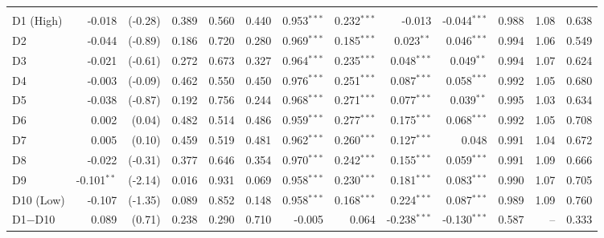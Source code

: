 {\begin{longtable}[t]{lrrrrrrrrrrrr}
\addlinespace[0.3em]
\hline
\multicolumn{13}{l}{\textit{Panel E: P3 (from Sep 2010), cohorts 5, 6, 7}}\\
\hspace{1em}D1 (High) & -0.018 & (-0.28) & 0.389 & 0.560 & 0.440 & 0.953$^{***}$ & 0.232$^{***}$ & -0.013 & -0.044$^{***}$ & 0.988 & 1.08 & 0.638\\
\hspace{1em}D2 & -0.044 & (-0.89) & 0.186 & 0.720 & 0.280 & 0.969$^{***}$ & 0.185$^{***}$ & 0.023$^{**}$ & 0.046$^{***}$ & 0.994 & 1.06 & 0.549\\
\hspace{1em}D3 & -0.021 & (-0.61) & 0.272 & 0.673 & 0.327 & 0.964$^{***}$ & 0.235$^{***}$ & 0.048$^{***}$ & 0.049$^{**}$ & 0.994 & 1.07 & 0.624\\
\hspace{1em}D4 & -0.003 & (-0.09) & 0.462 & 0.550 & 0.450 & 0.976$^{***}$ & 0.251$^{***}$ & 0.087$^{***}$ & 0.058$^{***}$ & 0.992 & 1.05 & 0.680\\
\hspace{1em}D5 & -0.038 & (-0.87) & 0.192 & 0.756 & 0.244 & 0.968$^{***}$ & 0.271$^{***}$ & 0.077$^{***}$ & 0.039$^{**}$ & 0.995 & 1.03 & 0.634\\
\hspace{1em}D6 & 0.002 & (0.04) & 0.482 & 0.514 & 0.486 & 0.959$^{***}$ & 0.277$^{***}$ & 0.175$^{***}$ & 0.068$^{***}$ & 0.992 & 1.05 & 0.708\\
\hspace{1em}D7 & 0.005 & (0.10) & 0.459 & 0.519 & 0.481 & 0.962$^{***}$ & 0.260$^{***}$ & 0.127$^{***}$ & 0.048 & 0.991 & 1.04 & 0.672\\
\hspace{1em}D8 & -0.022 & (-0.31) & 0.377 & 0.646 & 0.354 & 0.970$^{***}$ & 0.242$^{***}$ & 0.155$^{***}$ & 0.059$^{***}$ & 0.991 & 1.09 & 0.666\\
\hspace{1em}D9 & -0.101$^{**}$ & (-2.14) & 0.016 & 0.931 & 0.069 & 0.958$^{***}$ & 0.230$^{***}$ & 0.181$^{***}$ & 0.083$^{***}$ & 0.990 & 1.07 & 0.705\\
\hspace{1em}D10 (Low) & -0.107 & (-1.35) & 0.089 & 0.852 & 0.148 & 0.958$^{***}$ & 0.168$^{***}$ & 0.224$^{***}$ & 0.087$^{***}$ & 0.989 & 1.09 & 0.760\\
\hspace{1em}D1$-$D10 & 0.089 & (0.71) & 0.238 & 0.290 & 0.710 & -0.005 & 0.064 & -0.238$^{***}$ & -0.130$^{***}$ & 0.587 & -- & 0.333\\

\end{longtable}}
